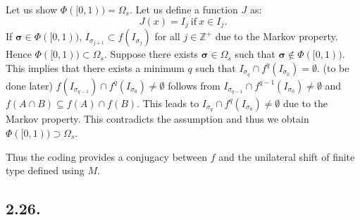 \documentclass[a4paper,11pt,fleqn]{article}
\begin{document}
Let us show $\Phi([0,1))=\Omega_s$. 
Let us define a function $J$ as: 
\begin{equation}
    J(x) = I_j \ \text{if} \ x\in I_j. 
\end{equation}
\fi
If ${\bm \sigma}\in\Phi([0,1))$,  $I_{\sigma_{j+1}} \subset f(I_{\sigma_j})$ for all $j\in\mathbb{Z}^+$ due to the Markov property. Hence $\Phi([0,1))\subset \Omega_s$. Suppose there exists ${\bm \sigma}\in \Omega_s$ such that ${\bm \sigma} \notin \Phi([0,1))$. This implies that there exists a minimum $q$ such that $I_{\sigma_q} \cap f^q(I_{\sigma_0}) = \emptyset$. (to be done later)
$f(I_{\sigma_{q-1}}) \cap f^{q}(I_{\sigma_0}) \neq \emptyset$ follows from $I_{\sigma_{q-1}} \cap f^{q-1}(I_{\sigma_0}) \neq \emptyset$ and $f(A\cap B) \subseteq f(A) \cap f(B)$. This leads to $I_{\sigma_q} \cap f^q(I_{\sigma_0}) \neq \emptyset$ due to the Markov property. This contradicts the assumption and thus we obtain $\Phi([0,1))\supset \Omega_s$. 

Thus the coding provides a conjugacy between $f$ and the unilateral shift of finite type defined using $M$.  
\fi
\hruleskip

\subsection{2.26.}
\end{document}
